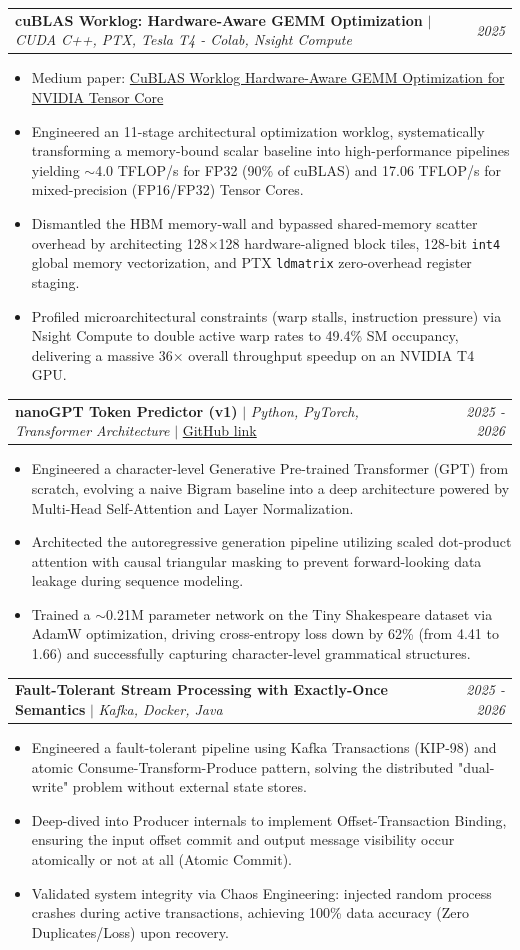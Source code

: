 \documentclass[letterpaper,11pt]{article}
\makeatletter
\newcommand{\resumeItem}[1]{
  \item\small{
    {#1 \vspace{-1pt}}
  }
}
\newcommand{\resumeProjectHeading}[2]{
    \vspace{-5pt}\item
    \begin{tabular*}{1.001\textwidth}{l@{\extracolsep{\fill}}r}
      \small#1 & \textit{\small #2}\\ %
    \end{tabular*}\vspace{-7pt}
}
\newcommand{\resumeItemListStart}{\begin{itemize}[leftmargin=0.1in]}
\newcommand{\resumeItemListEnd}{\end{itemize}\vspace{-5pt}}
\makeatother
\begin{document}
    \resumeProjectHeading
    {\textbf{cuBLAS Worklog: Hardware-Aware GEMM Optimization} $|$ \emph{CUDA C++, PTX, Tesla T4 - Colab, Nsight Compute}} {2025}
   \resumeItemListStart
        \resumeItem{\normalsize{Medium paper: \href{https://medium.com/@minhdrake/cublas-worklog-hardware-aware-gemm-optimization-for-nvidia-tensor-cores-ddf2712a6a33}{CuBLAS Worklog Hardware-Aware GEMM Optimization for NVIDIA Tensor Core}}}
        \resumeItem{\normalsize{Engineered an 11-stage architectural optimization worklog, systematically transforming a memory-bound scalar baseline into high-performance pipelines yielding $\sim$4.0 TFLOP/s for FP32 (90\% of cuBLAS) and 17.06 TFLOP/s for mixed-precision (FP16/FP32) Tensor Cores.}}
        \resumeItem{\normalsize{Dismantled the HBM memory-wall and bypassed shared-memory scatter overhead by architecting 128$\times$128 hardware-aligned block tiles, 128-bit \texttt{int4} global memory vectorization, and PTX \texttt{ldmatrix} zero-overhead register staging.}}
        \resumeItem{\normalsize{Profiled microarchitectural constraints (warp stalls, instruction pressure) via Nsight Compute to double active warp rates to 49.4\% SM occupancy, delivering a massive 36$\times$ overall throughput speedup on an NVIDIA T4 GPU.}}
    \resumeItemListEnd
    \resumeProjectHeading
    {\textbf{nanoGPT Token Predictor (v1)} $|$ \emph{Python, PyTorch, Transformer Architecture} $|$ \href{https://github.com/danepham2204/nanoGPT-Token-Prediction}{GitHub link}} {2025 - 2026}
    \resumeItemListStart
        \resumeItem{\normalsize{Engineered a character-level Generative Pre-trained Transformer (GPT) from scratch, evolving a naive Bigram baseline into a deep architecture powered by Multi-Head Self-Attention and Layer Normalization.}}
        \resumeItem{\normalsize{Architected the autoregressive generation pipeline utilizing scaled dot-product attention with causal triangular masking to prevent forward-looking data leakage during sequence modeling.}}
        \resumeItem{\normalsize{Trained a $\sim$0.21M parameter network on the Tiny Shakespeare dataset via AdamW optimization, driving cross-entropy loss down by 62\% (from 4.41 to 1.66) and successfully capturing character-level grammatical structures.}}
    \resumeItemListEnd

    \resumeProjectHeading
    {\textbf{Fault-Tolerant Stream Processing with Exactly-Once Semantics} $|$ \emph{Kafka, Docker, Java}} {2025 - 2026}
    \resumeItemListStart
        \resumeItem{\normalsize{Engineered a fault-tolerant pipeline using Kafka Transactions (KIP-98) and atomic Consume-Transform-Produce pattern, solving the distributed "dual-write" problem without external state stores.}}
        \resumeItem{\normalsize{Deep-dived into Producer internals to implement Offset-Transaction Binding, ensuring the input offset commit and output message visibility occur atomically or not at all (Atomic Commit).}}
        \resumeItem{\normalsize{Validated system integrity via Chaos Engineering: injected random process crashes during active transactions, achieving 100\% data accuracy (Zero Duplicates/Loss) upon recovery.}}
    \resumeItemListEnd
\end{document}
